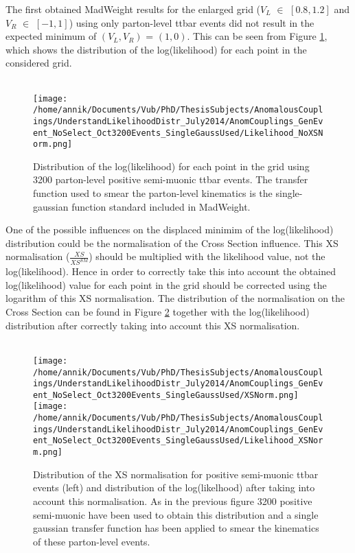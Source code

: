 The first obtained MadWeight results for the enlarged grid ($V_L$ $\in$ $[0.8,1.2]$ and $V_R$ $\in$ $[-1,1]$) using only parton-level ttbar events did not result in the expected minimum of $(V_L,V_R)$ = $(1, 0)$. This can be seen from Figure \ref{fig::Likelihood}, which shows the distribution of the log(likelihood) for each point in the considered grid.\\ \\
\begin{figure}[!h]
 \centering
 \texttt{[image: /home/annik/Documents/Vub/PhD/ThesisSubjects/AnomalousCouplings/UnderstandLikelihoodDistr\_July2014/AnomCouplings\_GenEvent\_NoSelect\_Oct3200Events\_SingleGaussUsed/Likelihood\_NoXSNorm.png]}
 \caption{Distribution of the log(likelihood) for each point in the grid using 3200 parton-level positive semi-muonic ttbar events. The transfer function used to smear the parton-level kinematics is the single-gaussian function standard included in MadWeight.}
 \label{fig::Likelihood}
\end{figure}
One of the possible influences on the displaced minimim of the log(likelihood) distribution could be the normalisation of the Cross Section influence. This XS normalisation ($\frac{XS}{XS^{SM}}$) should be multiplied with the likelihood value, not the log(likelihood). Hence in order to correctly take this into account the obtained log(likelihood) value for each point in the grid should be corrected using the logarithm of this XS normalisation. The distribution of the normalisation on the Cross Section can be found in Figure \ref{fig::XSandLikelihoodNorm} together with the log(likelihood) distribution after correctly taking into account this XS normalisation.\\ \\
\begin{figure}[!h]
 \texttt{[image: /home/annik/Documents/Vub/PhD/ThesisSubjects/AnomalousCouplings/UnderstandLikelihoodDistr\_July2014/AnomCouplings\_GenEvent\_NoSelect\_Oct3200Events\_SingleGaussUsed/XSNorm.png]}
 \texttt{[image: /home/annik/Documents/Vub/PhD/ThesisSubjects/AnomalousCouplings/UnderstandLikelihoodDistr\_July2014/AnomCouplings\_GenEvent\_NoSelect\_Oct3200Events\_SingleGaussUsed/Likelihood\_XSNorm.png]}
 \caption{Distribution of the XS normalisation for positive semi-muonic ttbar events (left) and distribution of the log(likelhood) after taking into account this normalisation. As in the previous figure 3200 positive semi-muonic have been used to obtain this distribution and a single gaussian transfer function has been applied to smear the kinematics of these parton-level events.}
 \label{fig::XSandLikelihoodNorm}
\end{figure}

